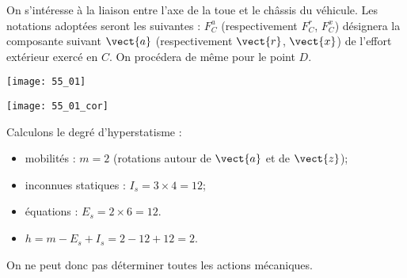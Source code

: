 \normalfalse \difficiletrue \tdifficilefalse
\correctiontrue


\setcounter{question}{0}%
\ifcorrection
\else
{}
\fi

\ifprof
\else
On s'intéresse à la liaison entre l'axe de la toue et le châssis du véhicule. Les notations adoptées seront les suivantes : $F^a_{C}$ (respectivement $F^r_{C}$, $F^x_{C}$) désignera la composante suivant $\vect{a}$ (respectivement $\vect{r}$, $\vect{x}$) de l'effort extérieur exercé en $C$. On procédera de même pour le point $D$. 
\begin{marginfigure}
\texttt{[image: 55\_01]}
\end{marginfigure}


\fi

\ifprof
\begin{marginfigure}
\texttt{[image: 55\_01\_cor]}
\end{marginfigure}

\else
\fi



\ifprof
Calculons le degré d'hyperstatisme : 
\begin{itemize}
\item mobilités : $m=2$ (rotations autour de $\vect{a}$ et de $\vect{z}$);
\item inconnues statiques : $I_s = 3 \times 4 = 12$;
\item équations : $E_s = 2\times 6=12$. 
\item $h = m-E_s + I_s= 2 -12 + 12 = 2$.
\end{itemize}
On ne peut donc pas déterminer toutes les actions mécaniques. 

\else
\fi
\ifprof
\else


\fi